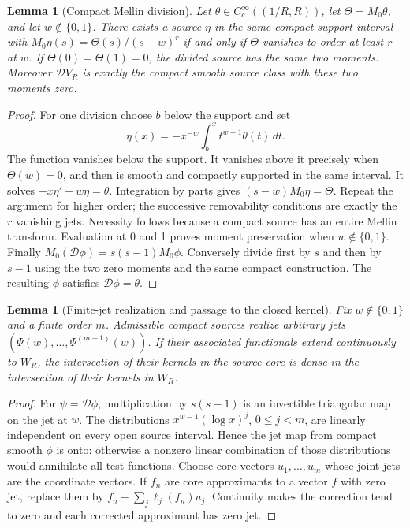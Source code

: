 \documentclass[11pt]{article}
\newtheorem{lemma}[theorem]{Lemma}
\theoremstyle{remark}
\begin{document}
\begin{lemma}[Compact Mellin division]\label{lem:compact-division}
Let $\theta\in C_c^\infty((1/R,R))$, let $\Theta=M_0\theta$, and let
$w\notin\{0,1\}$. There exists a source $\eta$ in the same compact
support interval with $M_0\eta(s)=\Theta(s)/(s-w)^r$ if and only if
$\Theta$ vanishes to order at least $r$ at $w$. If
$\Theta(0)=\Theta(1)=0$, the divided source has the same two moments.
Moreover $\mathcal D V_R$ is exactly the compact smooth source class with
these two moments zero.
\end{lemma}
\begin{proof}
For one division choose $b$ below the support and set
\[
 \eta(x)=-x^{-w}\int_b^x t^{w-1}\theta(t)\,dt.
\]
The function vanishes below the support. It vanishes above it precisely
when $\Theta(w)=0$, and then is smooth and compactly supported in the
same interval. It solves $-x\eta'-w\eta=\theta$. Integration by parts
gives $(s-w)M_0\eta=\Theta$. Repeat the argument for higher order; the
successive removability conditions are exactly the $r$ vanishing jets.
Necessity follows because a compact source has an entire Mellin transform.
Evaluation at 0 and 1 proves moment preservation when $w\notin\{0,1\}$.
Finally $M_0(\mathcal D\phi)=s(s-1)M_0\phi$. Conversely divide first by
$s$ and then by $s-1$ using the two zero moments and the same compact
construction. The resulting $\phi$ satisfies $\mathcal D\phi=\theta$.
\end{proof}

\begin{lemma}[Finite-jet realization and passage to the closed kernel]\label{lem:jet-density}
Fix $w\notin\{0,1\}$ and a finite order $m$. Admissible compact sources
realize arbitrary jets $(\Psi(w),\ldots,\Psi^{(m-1)}(w))$.
If their associated functionals extend continuously to $W_R$, the
intersection of their kernels in the source core is dense in the
intersection of their kernels in $W_R$.
\end{lemma}
\begin{proof}
For $\psi=\mathcal D\phi$, multiplication by $s(s-1)$ is an invertible
triangular map on the jet at $w$. The distributions
$x^{w-1}(\log x)^j$, $0\le j<m$, are linearly independent on every open
source interval. Hence the jet map from compact smooth $\phi$ is onto:
otherwise a nonzero linear combination of those distributions would
annihilate all test functions. Choose core vectors $u_1,\ldots,u_m$
whose joint jets are the coordinate vectors. If $f_n$ are core
approximants to a vector $f$ with zero jet, replace them by
$f_n-\sum_j\ell_j(f_n)u_j$. Continuity makes the correction tend to zero
and each corrected approximant has zero jet.
\end{proof}
\end{document}
